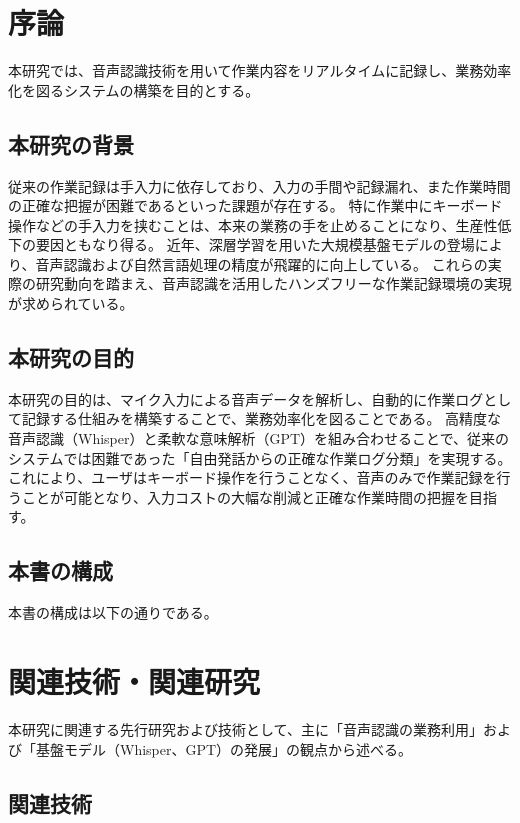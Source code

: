 \documentclass[a4paper,12pt,ja=standard,lualatex]{bxjsarticle}
\begin{document}
\newpage

\tableofcontents
\newpage
\setcounter{page}{1}
\pagestyle{plain}

\section{序論}\label{sec1}
本研究では、音声認識技術を用いて作業内容をリアルタイムに記録し、業務効率化を図るシステムの構築を目的とする。

\subsection{本研究の背景}
従来の作業記録は手入力に依存しており、入力の手間や記録漏れ、また作業時間の正確な把握が困難であるといった課題が存在する。
特に作業中にキーボード操作などの手入力を挟むことは、本来の業務の手を止めることになり、生産性低下の要因ともなり得る。
近年、深層学習を用いた大規模基盤モデルの登場により、音声認識および自然言語処理の精度が飛躍的に向上している。
これらの実際の研究動向を踏まえ、音声認識を活用したハンズフリーな作業記録環境の実現が求められている。

\subsection{本研究の目的}
本研究の目的は、マイク入力による音声データを解析し、自動的に作業ログとして記録する仕組みを構築することで、業務効率化を図ることである。
高精度な音声認識（Whisper）と柔軟な意味解析（GPT）を組み合わせることで、従来のシステムでは困難であった「自由発話からの正確な作業ログ分類」を実現する。
これにより、ユーザはキーボード操作を行うことなく、音声のみで作業記録を行うことが可能となり、入力コストの大幅な削減と正確な作業時間の把握を目指す。

\subsection{本書の構成}
本書の構成は以下の通りである。

\newpage

\section{関連技術・関連研究}\label{sec2}
本研究に関連する先行研究および技術として、主に「音声認識の業務利用」および「基盤モデル（Whisper、GPT）の発展」の観点から述べる。

\subsection{関連技術}
\end{document}

